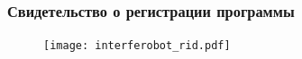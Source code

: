 \begin{frame}
    \frametitle{Свидетельство о регистрации программы}
    \begin{figure}[h]
        \centering
        \texttt{[image: interferobot\_rid.pdf]}
    \end{figure}
\end{frame}


